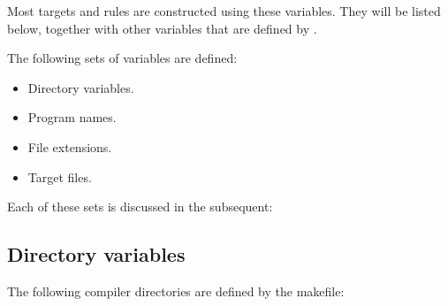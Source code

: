 Most targets and rules are constructed using these variables. They will be
listed below, together with other variables that are defined by \fpcmake{}.

The following sets of variables are defined:
\begin{itemize}
\item Directory variables.
\item Program names.
\item File extensions.
\item Target files.
\end{itemize}
Each of these sets is discussed in the subsequent:

\subsection{Directory variables}

The following compiler directories are defined by the makefile:

